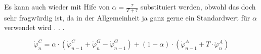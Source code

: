 \documentclass{article}
\begin{document}
Es kann auch wieder mit Hife von $\alpha = \frac{\tau}{T + \tau}$ substituiert werden, obwohl das doch sehr fragwürdig ist, da in der Allgemeinheit ja ganz gerne ein Standardwert für $\alpha$ verwendet wird . . . 

\begin{equation}
\dot{\varphi}^C_n = \alpha \cdot (\dot{\varphi}^C_{n-1} + \dot{\varphi}^G_n - \dot{\varphi}^G_{n-1}) + (1-\alpha) \cdot (\dot{\varphi}^A_{n-1} + T \cdot \ddot{\varphi}^A_n)
\end{equation}
\end{document}
